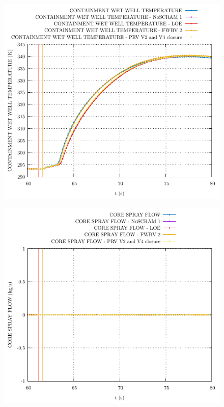 \documentclass{article}
\begin{document}
\begin{multicols}{2}
\begin{figure}[H]
\end{figure}
\begin{figure}[H]
\centering
\includegraphics[width=\linewidth]{./graphs/CONTAINMENT WET WELL TEMPERATURE.pdf}
\end{figure}
\begin{figure}[H]
\centering
\includegraphics[width=\linewidth]{./graphs/CORE SPRAY FLOW.pdf}
\end{figure}

\end{multicols}
\end{document}
